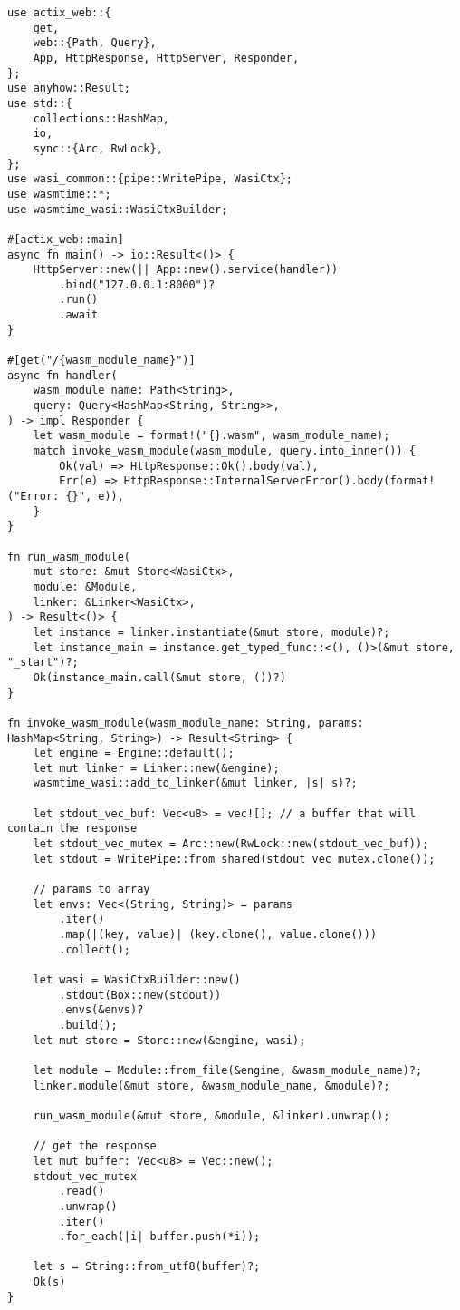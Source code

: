 \begin{lstlisting}[frame=lines, style=Rust, caption={Simple Proof of Concept Wasm Serverless Platform using Actix and Wasmtime}, showstringspaces=false, captionpos=b,]
use actix_web::{
    get,
    web::{Path, Query},
    App, HttpResponse, HttpServer, Responder,
};
use anyhow::Result;
use std::{
    collections::HashMap,
    io,
    sync::{Arc, RwLock},
};
use wasi_common::{pipe::WritePipe, WasiCtx};
use wasmtime::*;
use wasmtime_wasi::WasiCtxBuilder;
    
#[actix_web::main]
async fn main() -> io::Result<()> {
    HttpServer::new(|| App::new().service(handler))
        .bind("127.0.0.1:8000")?
        .run()
        .await
}
    
#[get("/{wasm_module_name}")]
async fn handler(
    wasm_module_name: Path<String>,
    query: Query<HashMap<String, String>>,
) -> impl Responder {
    let wasm_module = format!("{}.wasm", wasm_module_name);
    match invoke_wasm_module(wasm_module, query.into_inner()) {
        Ok(val) => HttpResponse::Ok().body(val),
        Err(e) => HttpResponse::InternalServerError().body(format!("Error: {}", e)),
    }
}
    
fn run_wasm_module(
    mut store: &mut Store<WasiCtx>,
    module: &Module,
    linker: &Linker<WasiCtx>,
) -> Result<()> {
    let instance = linker.instantiate(&mut store, module)?;
    let instance_main = instance.get_typed_func::<(), ()>(&mut store, "_start")?;
    Ok(instance_main.call(&mut store, ())?)
}
    
fn invoke_wasm_module(wasm_module_name: String, params: HashMap<String, String>) -> Result<String> {
    let engine = Engine::default();
    let mut linker = Linker::new(&engine);
    wasmtime_wasi::add_to_linker(&mut linker, |s| s)?;

    let stdout_vec_buf: Vec<u8> = vec![]; // a buffer that will contain the response
    let stdout_vec_mutex = Arc::new(RwLock::new(stdout_vec_buf));
    let stdout = WritePipe::from_shared(stdout_vec_mutex.clone());

    // params to array
    let envs: Vec<(String, String)> = params
        .iter()
        .map(|(key, value)| (key.clone(), value.clone()))
        .collect();

    let wasi = WasiCtxBuilder::new()
        .stdout(Box::new(stdout))
        .envs(&envs)?
        .build();
    let mut store = Store::new(&engine, wasi);

    let module = Module::from_file(&engine, &wasm_module_name)?;
    linker.module(&mut store, &wasm_module_name, &module)?;

    run_wasm_module(&mut store, &module, &linker).unwrap();

    // get the response
    let mut buffer: Vec<u8> = Vec::new();
    stdout_vec_mutex
        .read()
        .unwrap()
        .iter()
        .for_each(|i| buffer.push(*i));

    let s = String::from_utf8(buffer)?;
    Ok(s)
}
\end{lstlisting}